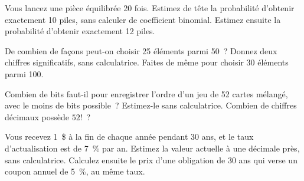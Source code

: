 \begin{question}\label{iq:iv1:mental-technique:37}
Vous lancez une pièce équilibrée 20 fois. Estimez de tête la probabilité d'obtenir exactement 10 piles, sans calculer de coefficient binomial. Estimez ensuite la probabilité d'obtenir exactement 12 piles.
\end{question}

\begin{question}\label{iq:iv1:mental-technique:38}
De combien de façons peut-on choisir 25 éléments parmi 50~? Donnez deux chiffres significatifs, sans calculatrice. Faites de même pour choisir 30 éléments parmi 100.
\end{question}

\begin{question}\label{iq:iv1:mental-technique:39}
Combien de bits faut-il pour enregistrer l'ordre d'un jeu de 52 cartes mélangé, avec le moins de bits possible~? Estimez-le sans calculatrice. Combien de chiffres décimaux possède $52!$~?
\end{question}

\begin{question}\label{iq:iv1:mental-technique:40}
Vous recevez 1~\$ à la fin de chaque année pendant 30 ans, et le taux d'actualisation est de 7~\% par an. Estimez la valeur actuelle à une décimale près, sans calculatrice. Calculez ensuite le prix d'une obligation de 30 ans qui verse un coupon annuel de 5~\%, au même taux.
\end{question}
